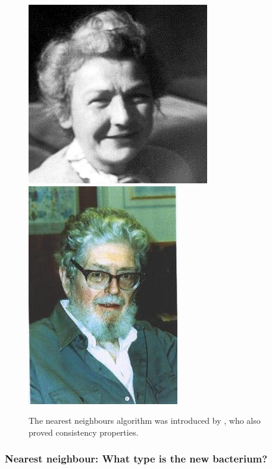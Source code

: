 \begin{frame}
  \begin{figure}[H]
    \centering
    \includegraphics[width=\fwidth]{../figures/fix_evelyn2}
    \includegraphics[width=\fwidth]{../figures/Hodges}
    \caption{The nearest neighbours algorithm was introduced by \citet{fix1951discriminatory}, who also proved consistency properties.}
  \end{figure}
\end{frame}

\begin{frame}
  \frametitle{Nearest neighbour: What type is the new bacterium?}
  
\end{frame}

